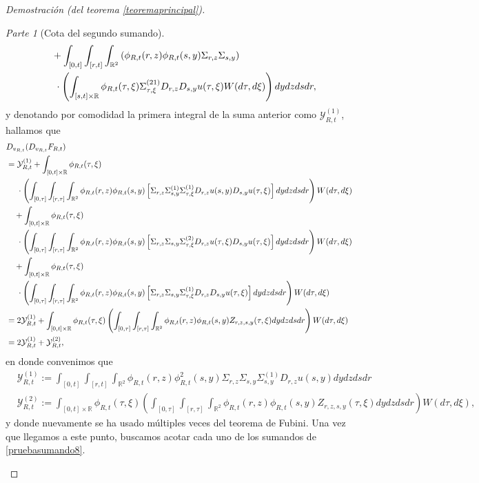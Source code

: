 \documentclass[letterpaper,twoside,12pt]{book}
\newcommand{\R}{\mathbb{R}}
\newcommand{\1}{\mathds{1}}
\theoremstyle{definition}
\theoremstyle{definition}
\theoremstyle{remark}
\newtheorem{proofpart}{Parte}
\theoremstyle{definition}
\theoremstyle{definition}
\theoremstyle{definition}
\theoremstyle{definition}
\theoremstyle{definition}
\begin{document}
\begin{proof}[Demostración (del teorema \ref{teoremaprincipal})]
\begin{proofpart}[Cota del segundo sumando]
\begin{align}
   &\ \ \ +\int_{[0,t]}\int_{[r,t]}\int_{\R^2}\left(\phi_{R,t}(r,z)\phi_{R,t}(s,y)\Sigma_{r,z}\Sigma_{s,y}\right)\notag\\
   &\ \ \ \ \cdot \left(\int_{[s,t]\times\R}\phi_{R,t}(\tau,\xi)\Sigma_{\tau,\xi}^{(21)}D_{r,z}D_{s,y}u(\tau,\xi)W(d\tau,d\xi)\right)dy dz ds dr,\notag
\end{align}
y denotando por comodidad la primera integral de la suma anterior como $\mathcal{Y}_{R,t}^{(1)}$, hallamos que 
\begin{align}
   &D_{v_{R,t}}(D_{v_{R,t}}F_{R,t})\notag\\
   &=\mathcal{Y}_{R,t}^{(1)}+\int_{[0,t]\times\R}\phi_{R,t}(\tau,\xi)\notag\\
   & \ \ \ \ \cdot \left(\int_{[0,\tau]}\int_{[r,\tau]}\int_{\R^2}\phi_{R,t}(r,z)\phi_{R,t}(s,y)\left[\Sigma_{r,z}\Sigma_{s,y}^{(1)}\Sigma_{\tau,\xi}^{(1)}D_{r,z}u(s,y)D_{s,y}u(\tau,\xi)\right]dy dz ds dr\right) W(d\tau,d\xi)\notag\\
   &\ \ \ +\int_{[0,t]\times\R}\phi_{R,t}(\tau,\xi)\notag\\
   &\ \ \ \ \cdot\left(\int_{[0,\tau]}\int_{[r,\tau]}\int_{\R^2}\phi_{R,t}(r,z)\phi_{R,t}(s,y)\left[\Sigma_{r,z}\Sigma_{s,y}\Sigma_{\tau,\xi}^{(2)}D_{r,z}u(\tau,\xi)D_{s,y}u(\tau,\xi)\right]dy dz ds dr\right) W(d\tau,d\xi)\notag\\
   &\ \ \ +\int_{[0,t]\times\R}\phi_{R,t}(\tau,\xi)\notag\\
   &\ \ \ \ \cdot\left(\int_{[0,\tau]}\int_{[r,\tau]}\int_{\R^2}\phi_{R,t}(r,z)\phi_{R,t}(s,y)\left[\Sigma_{r,z}\Sigma_{s,y}\Sigma_{\tau,\xi}^{(1)}D_{r,z}D_{s,y}u(\tau,\xi)\right]dy dz ds dr\right) W(d\tau,d\xi)\notag\\
   &=2\mathcal{Y}_{R,t}^{(1)}+\int_{[0,t]\times\R}\phi_{R,t}(\tau,\xi)\left(\int_{[0,\tau]}\int_{[r,\tau]}\int_{\R^2}\phi_{R,t}(r,z)\phi_{R,t}(s,y)Z_{r,z,s,y}(\tau,\xi)dy dz ds dr\right)W(d\tau,d\xi)\notag\\
   &=2\mathcal{Y}_{R,t}^{(1)}+\mathcal{Y}_{R,t}^{(2)},\label{pruebasumando8}
\end{align}
en donde convenimos que
\begin{align*}
   &\mathcal{Y}_{R,t}^{(1)}:=\int_{[0,t]}\int_{[r,t]}\int_{\R^2}\phi_{R,t}(r,z)\phi_{R,t}^2(s,y)\Sigma_{r,z}\Sigma_{s,y}\Sigma^{(1)}_{s,y}D_{r,z}u(s,y)dy dz ds dr\\
   &\mathcal{Y}_{R,t}^{(2)}:=\int_{[0,t]\times\R}\phi_{R,t}(\tau,\xi)\left(\int_{[0,\tau]}\int_{[r,\tau]}\int_{\R^2}\phi_{R,t}(r,z)\phi_{R,t}(s,y)Z_{r,z,s,y}(\tau,\xi)dy dz ds dr\right)W(d\tau,d\xi),
\end{align*}
y donde nuevamente se ha usado múltiples veces del teorema de Fubini. Una vez que llegamos a este punto, buscamos acotar cada uno de los sumandos de \eqref{pruebasumando8}. 


\end{proofpart}
\end{proof}
\end{document}
